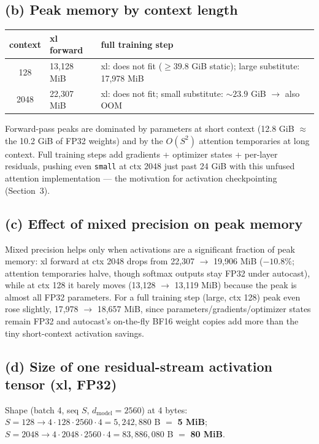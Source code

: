 \documentclass[11pt]{article}
\newcommand{\code}[1]{\texttt{#1}}
\begin{document}
\subsection{(b) Peak memory by context length}

\begin{center}
\begin{tabular}{cll}
\toprule
context & xl forward & full training step \\
\midrule
128  & 13,128 MiB & xl: does not fit ($\ge 39.8$ GiB static); large substitute: 17,978 MiB \\
2048 & 22,307 MiB & xl: does not fit; small substitute: ${\sim}23.9$ GiB $\to$ also OOM \\
\bottomrule
\end{tabular}
\end{center}

Forward-pass peaks are dominated by parameters at short context (12.8 GiB $\approx$ the 10.2 GiB of
FP32 weights) and by the $O(S^2)$ attention temporaries at long context. Full training steps add
gradients + optimizer states + per-layer residuals, pushing even \code{small} at ctx 2048 just past
24 GiB with this unfused attention implementation --- the motivation for activation checkpointing
(Section~3).

\subsection{(c) Effect of mixed precision on peak memory}

Mixed precision helps only when activations are a significant fraction of peak memory: xl forward at
ctx 2048 drops from 22,307 $\to$ 19,906 MiB ($-10.8\%$; attention temporaries halve, though softmax
outputs stay FP32 under autocast), while at ctx 128 it barely moves (13,128 $\to$ 13,119 MiB) because
the peak is almost all FP32 parameters. For a full training step (large, ctx 128) peak even rose
slightly, 17,978 $\to$ 18,657 MiB, since parameters/gradients/optimizer states remain FP32 and
autocast's on-the-fly BF16 weight copies add more than the tiny short-context activation savings.

\subsection{(d) Size of one residual-stream activation tensor (xl, FP32)}

Shape (batch 4, seq $S$, $d_{\text{model}}=2560$) at 4 bytes: $S=128 \to 4\cdot128\cdot2560\cdot4 =
5{,}242{,}880$ B $=$ \textbf{5 MiB}; $S=2048 \to 4\cdot2048\cdot2560\cdot4 = 83{,}886{,}080$ B $=$
\textbf{80 MiB}.
\end{document}

